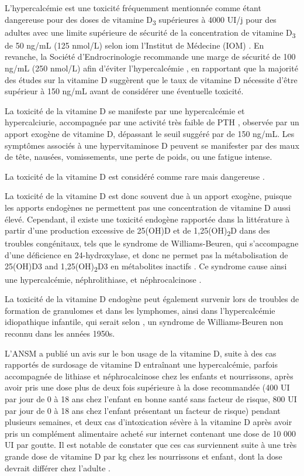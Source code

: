 \documentclass[
  a4paper,
  DIV=11,
  numbers=noendperiod,
  listof=totoc]{scrreprt}
\begin{document}
L'hypercalcémie est une toxicité fréquemment mentionnée comme étant
dangereuse pour des doses de vitamine D\textsubscript{3} supérieures à
4000 UI/j pour des adultes avec une limite supérieure de sécurité de la
concentration de vitamine D\textsubscript{3} de 50 ng/mL (125 nmol/L)
selon \ac{iom} l'Institut de Médecine (IOM)
\autocites[pp.~9-10]{IOM.2011.org}{Holick.2011}. En revanche, la Société
d'Endrocrinologie recommande une marge de sécurité de 100 ng/mL (250
nmol/L) afin d'éviter l'hypercalcémie \autocite{Holick.2011}, en
rapportant que la majorité des études sur la vitamine D suggèrent que le
taux de vitamine D nécessite d'être supérieur à 150 ng/mL avant de
considérer une éventuelle toxicité.

La toxicité de la vitamine D se manifeste par une hypercalcémie et
hypercalciurie, accompagnée par une activité très faible de PTH
\autocite{Marcinowska-Suchowierska.2018}, observée par un apport exogène
de vitamine D, dépassant le seuil suggéré par \textcite{Holick.2011} de
150 ng/mL. Les symptômes associés à une hypervitaminose D peuvent se
manifester par des maux de tête, nausées, vomissements, une perte de
poids, ou une fatigue intense.

La toxicité de la vitamine D est considéré comme rare mais dangereuse
\autocite{Marcinowska-Suchowierska.2018,Holick.2015}.

La toxicité de la vitamine D est donc souvent due à un apport exogène,
puisque les apports endogènes ne permettent pas une concentration de
vitamine D aussi élevé. Cependant, il existe une toxicité endogène
rapportée dans la littérature à partir d'une production excessive de
25(OH)D et de 1,25(OH)\textsubscript{2}D dans des troubles congénitaux,
tels que le syndrome de Williams-Beuren, qui s'accompagne d'une
déficience en 24-hydroxylase, et donc ne permet pas la métabolisation de
25(OH)D3 and 1,25(OH)\textsubscript{2}D3 en métabolites inactifs
\autocite{Marcinowska-Suchowierska.2018,Holick.2015}. Ce syndrome cause
ainsi une hypercalcémie, néphrolithiase, et néphrocalcinose
\autocite{Azer.2021}.

La toxicité de la vitamine D endogène peut également survenir lors de
troubles de formation de granulomes et dans les lymphomes, ainsi dans
l'hypercalcémie idiopathique infantile, qui serait selon
\textcite{Holick.2015}, un syndrome de Williams-Beuren non reconnu dans
les années 1950s.

L'ANSM a publié un avis sur le bon usage de la vitamine D, suite à des
cas rapportés de surdosage de vitamine D entraînant une hypercalcémie,
parfois accompagnée de lithiase et néphrocalcinose chez les enfants et
nourrissons, après avoir pris une dose plus de deux fois supérieure à la
dose recommandée (400 UI par jour de 0 à 18 ans chez l'enfant en bonne
santé sans facteur de risque, 800 UI par jour de 0 à 18 ans chez
l'enfant présentant un facteur de risque) pendant plusieurs semaines, et
deux cas d'intoxication sévère à la vitamine D après avoir pris un
complément alimentaire acheté sur internet contenant une dose de 10 000
UI par goutte. Il est notable de constater que ces cas surviennent suite
à une très grande dose de vitamine D par kg chez les nourrissons et
enfant, dont la dose devrait différer chez l'adulte
\autocite{ANSM.2021}.
\end{document}
